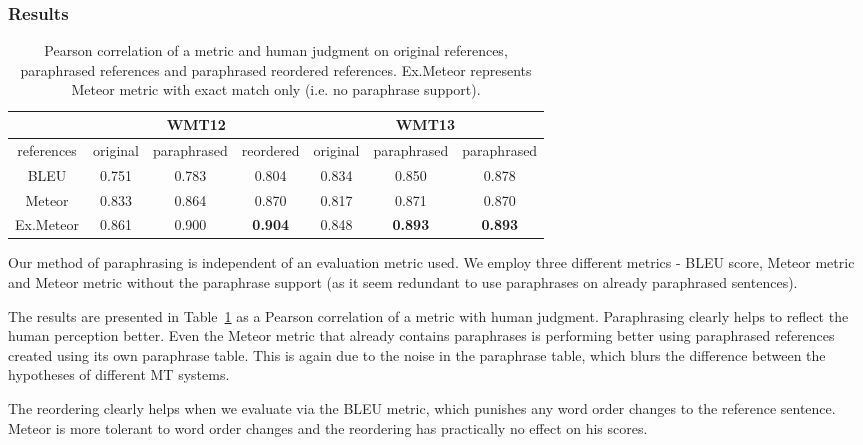 \documentclass[11pt]{article}
\def\Tref#1{Table~\ref{#1}}
\begin{document}
\subsubsection{Results}
\begin{table}[tb]
\begin{center}


\begin{tabular}{|c|ccc|ccc|}
\hline
\multicolumn{1}{|l|}{} & \multicolumn{3}{c|}{\textbf{WMT12}}   & \multicolumn{3}{c|}{\textbf{WMT13}}  \\ 
\hline
references             & original & paraphrased & reordered & original & paraphrased & paraphrased \\ 
\hline
BLEU                   & 0.751    & 0.783       & 0.804     & 0.834    & 0.850       & 0.878   \\  %
Meteor                 & 0.833    & 0.864       & 0.870     & 0.817    & 0.871       & 0.870   \\  %
Ex.Meteor              & 0.861    & 0.900  & \textbf{0.904} & 0.848  & \textbf{0.893} & \textbf{0.893}\\  %
\hline
\end{tabular}
\caption{Pearson correlation of a metric and human judgment on original 
references, paraphrased references and paraphrased reordered references. 
Ex.Meteor represents Meteor metric with exact match only (i.e. no paraphrase
support).}
\label{results:treex}
\end{center}
\end{table}

Our method of paraphrasing is independent of an evaluation metric used. We 
employ three different metrics - BLEU score, Meteor metric and Meteor metric 
without the paraphrase support (as it seem redundant to use paraphrases on 
already paraphrased sentences). 

The results are presented in \Tref{results:treex} as a Pearson correlation of a 
metric with human judgment. Paraphrasing clearly helps to reflect the human 
perception better. Even the Meteor metric that already contains paraphrases
is performing better using paraphrased references created using its own 
paraphrase table. This is again due to the noise in the paraphrase table, which
blurs the difference between the hypotheses of different MT systems.

The reordering clearly helps when we evaluate via the BLEU metric, which 
punishes any word order changes to the reference sentence. Meteor is more
tolerant to word order changes and the reordering has practically no effect 
on his scores.
\end{document}

